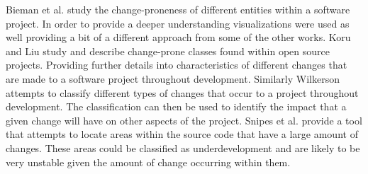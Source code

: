 Bieman et al. study the change-proneness of different entities within a software project. In order to provide a deeper understanding visualizations were used as well providing a bit of a different approach from some of the other works. Koru and Liu study and describe change-prone classes found within open source projects. Providing further details into characteristics of different changes that are made to a software project throughout development. Similarly Wilkerson attempts to classify different types of changes that occur to a project throughout development. The classification can then be used to identify the impact that a given change will have on other aspects of the project. Snipes et al. provide a tool that attempts to locate areas within the source code that have a large amount of changes. These areas could be classified as underdevelopment and are likely to be very unstable given the amount of change occurring within them.









